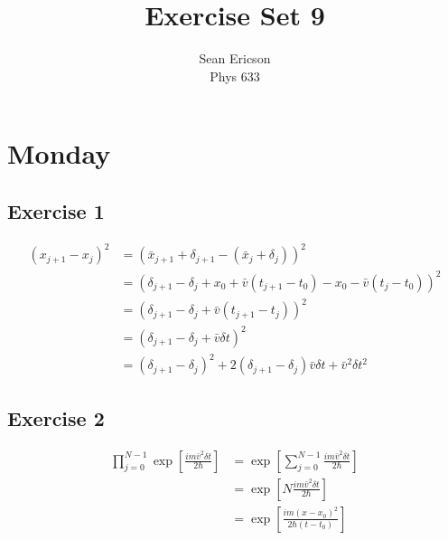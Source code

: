 \documentclass[12pt]{article}
\begin{document}
	
\title{Exercise Set 9}
\author{Sean Ericson \\ Phys 633}
\maketitle

\section*{Monday}
\subsection*{Exercise 1}
\begin{align*}
    \left(x_{j+1}-x_j\right)^2 &= \left(\bar{x}_{j+1} + \delta_{j+1} - \left(\bar{x}_j + \delta_j\right)\right)^2 \\
    &= \left(\delta_{j+1} - \delta_j + x_0 + \bar{v}(t_{j+1}-t_0) - x_0 - \bar{v}(t_j-t_0)\right)^2 \\
    &= \left(\delta_{j+1} - \delta_j + \bar{v}(t_{j+1}-t_j)\right)^2 \\
    &= \left(\delta_{j+1} - \delta_j + \bar{v}\delta t\right)^2 \\
    &= (\delta_{j+1} - \delta_j)^2 + 2(\delta_{j+1}-\delta_j)\bar{v}\delta t + \bar{v}^2\delta t^2
\end{align*}

\subsection*{Exercise 2}
\begin{align*}
    \prod_{j=0}^{N-1}\exp[\frac{im\bar{v}^2\delta t}{2\hbar}] &= \exp[\sum_{j=0}^{N-1}\frac{im\bar{v}^2\delta t}{2\hbar}] \\
    &= \exp[N\frac{im\bar{v}^2\delta t}{2\hbar}] \\
    &= \exp[\frac{im(x-x_0)^2}{2\hbar(t-t_0)}]
\end{align*}
\end{document}
